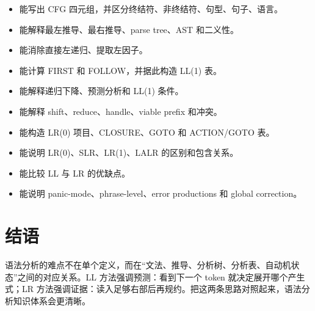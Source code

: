 \documentclass[UTF8,fontset=none,11pt]{ctexart}
\begin{document}
\begin{itemize}
  \item 能写出 CFG 四元组，并区分终结符、非终结符、句型、句子、语言。
  \item 能解释最左推导、最右推导、parse tree、AST 和二义性。
  \item 能消除直接左递归、提取左因子。
  \item 能计算 FIRST 和 FOLLOW，并据此构造 LL(1) 表。
  \item 能解释递归下降、预测分析和 LL(1) 条件。
  \item 能解释 shift、reduce、handle、viable prefix 和冲突。
  \item 能构造 LR(0) 项目、CLOSURE、GOTO 和 ACTION/GOTO 表。
  \item 能说明 LR(0)、SLR、LR(1)、LALR 的区别和包含关系。
  \item 能比较 LL 与 LR 的优缺点。
  \item 能说明 panic-mode、phrase-level、error productions 和 global correction。
\end{itemize}

\section*{结语}

语法分析的难点不在单个定义，而在“文法、推导、分析树、分析表、自动机状态”之间的对应关系。LL 方法强调预测：看到下一个 token 就决定展开哪个产生式；LR 方法强调证据：读入足够右部后再规约。把这两条思路对照起来，语法分析知识体系会更清晰。
\end{document}
